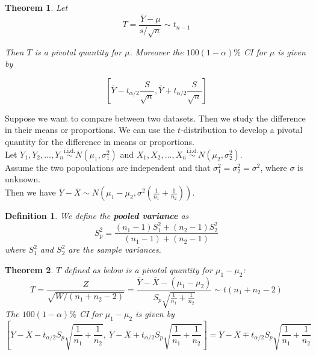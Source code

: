 \documentclass[a4paper,12pt]{article}
\theoremstyle{nonitalic}
\newtheorem{definition}{Definition}[subsection]
\newtheorem{theorem}{Theorem}[subsection]
\begin{document}
    \bigskip

    \begin{theorem}
        Let \[
            T = \frac{\overline{Y} - \mu}{s/\sqrt{n}} \sim t_{n-1}
        \]

        Then $T$ is a pivotal quantity for $\mu$. Moreover the $100(1-\alpha)\%$ CI for $\mu$ is given by

        \[
        \left[ \overline{Y} - t_{\alpha/2} \frac{S}{\sqrt{n}}, \overline{Y} + t_{\alpha/2} \frac{S}{\sqrt{n}} \right]
        \]
    \end{theorem}

    \bigskip

    Suppose we want to compare between two datasets. Then we study the difference in their means or proportions. We can use the $t$-distribution to develop a pivotal quantity for the difference in means or proportions.\\
    Let $Y_1, Y_2, \ldots, Y_n \overset{\text{i.i.d.}}{\sim} N(\mu_1, \sigma_1^2)$ and $X_1, X_2, \ldots, X_n \overset{\text{i.i.d.}}{\sim} N(\mu_2, \sigma_2^2)$.\\
    Assume the two popoulations are independent and that $\sigma_1^2 = \sigma_2^2 = \sigma^2$, where $\sigma$ is unknown.\\
    Then we have $\overline{Y} - \overline{X} \sim N\left(\mu_1 - \mu_2, \sigma^2 \left(\frac{1}{n_1} + \frac{1}{n_2}\right)\right)$.
    \begin{definition}
        We define the \textbf{pooled variance} as
    \[
        S_p^2 = \frac{(n_1-1)S_1^2 + (n_2-1)S_2^2}{(n_1-1) + (n_2-1)}
    \]
    where $S_1^2$ and $S_2^2$ are the sample variances.
    \end{definition}

    \bigskip

    \begin{theorem}
        $T$ defined as below is a pivotal quantity for $\mu_1 - \mu_2$:
        \[
            T = \frac{Z}{\sqrt{W/(n_1 + n_2 - 2)}} = \frac{\overline{Y} - \overline{X} - (\mu_1 - \mu_2)}{S_p \sqrt{\frac{1}{n_1} + \frac{1}{n_2}}} \sim t(n_1 + n_2 - 2)
        \]
        The $100(1-\alpha)\%$ CI for $\mu_1 - \mu_2$ is given by
        \[
            \left[ 
            \overline{Y} - \overline{X} - t_{\alpha/2} S_p \sqrt{\frac{1}{n_1} + \frac{1}{n_2}}, \ 
            \overline{Y} - \overline{X} + t_{\alpha/2} S_p \sqrt{\frac{1}{n_1} + \frac{1}{n_2}} 
            \right] = \overline{Y} - \overline{X} \mp t_{\alpha/2} S_p \sqrt{\frac{1}{n_1} + \frac{1}{n_2}}
        \]
    \end{theorem}
\end{document}
